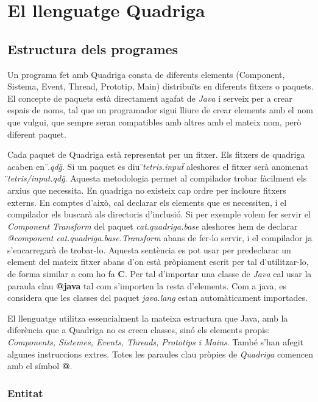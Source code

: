 \chapter{El llenguatge Quadriga}

\section{Estructura dels programes}

Un programa fet amb Quadriga consta de diferents elements (Component, Sistema, Event, Thread, Prototip, Main) distribuïts en diferents fitxers o paquets. El concepte de paquets està directament agafat de {\em Java} i serveix per a crear espais de noms, tal que un programador sigui lliure de crear elements amb el nom que vulgui, que sempre seran compatibles amb altres amb el mateix nom, però diferent paquet.

Cada paquet de Quadriga està representat per un fitxer. Els fitxers de quadriga acaben en {\em \"{}.qdg\"{}}. Si un paquet es diu {\em \"{}tetris.input\"{}} aleshores el fitxer serà anomenat {\em \"{}tetris/input.qdg\"{}}. Aquesta metodologia permet al compilador trobar fàcilment els arxius que necessita. En quadriga no existeix cap ordre per incloure fitxers externs. En comptes d'això, cal declarar els elements que es necessiten, i el compilador els buscarà als directoris d'inclusió. Si per exemple volem fer servir el {\em Component Transform} del paquet {\em cat.quadriga.base} aleshores hem de declarar {\em @component cat.quadriga.base.Transform} abans de fer-lo servir, i el compilador ja s'encarregarà de trobar-lo. Aquesta sentència es pot usar per predeclarar un element del mateix fitxer abans d'on està pròpiament escrit per tal d'utilitzar-lo, de forma similar a com ho fa {\bf C}. Per tal d'importar una classe de {\em Java} cal usar la paraula clau {\bf @java} tal com s'importen la resta d'elements. Com a java, es considera que les classes del paquet {\em java.lang} estan automàticament importades.

El llenguatge utilitza essencialment la mateixa estructura que Java, amb la diferència que a Quadriga no es creen classes, sinó els elements propis: {\em Components, Sistemes, Events, Threads, Prototips i Mains}. També s'han afegit algunes instruccions extres. Totes les paraules clau pròpies de {\em Quadriga} comencen amb el símbol {\bf @}.

\subsection{Entitat}

